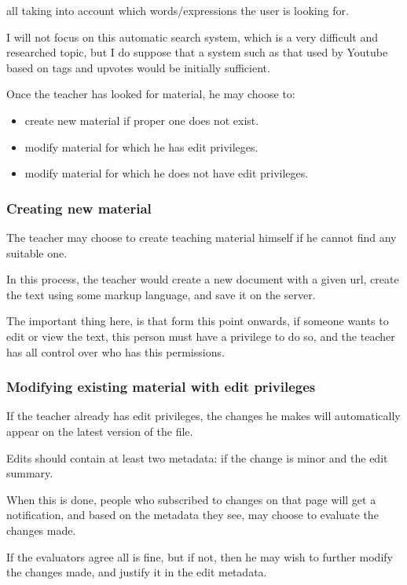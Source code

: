 \documentclass[12pt]{article}
\begin{document}
all taking into account which words/expressions the user is looking for.

I will not focus on this automatic search system, which is a very difficult and researched topic, but I do suppose that a system such as that used by Youtube based on tags and upvotes would be initially sufficient.

Once the teacher has looked for material, he may choose to:

\begin{itemize}
  \item create new material if proper one does not exist.
  \item modify material for which he has edit privileges.
  \item modify material for which he does not have edit privileges.
\end{itemize}

\subsubsection{Creating new material}

The teacher may choose to create teaching material himself if he cannot find any suitable one.

In this process, the teacher would create a new document with a given url, create the text using some markup language, and save it on the server.

The important thing here, is that form this point onwards, if someone wants to edit or view the text, this person must have a privilege to do so, and the teacher has all control over who has this permissions.

\subsubsection{Modifying existing material with edit privileges}

If the teacher already has edit privileges, the changes he makes will automatically appear on the latest version of the file.

Edits should contain at least two metadata: if the change is minor and the edit summary.

When this is done, people who subscribed to changes on that page will get a notification, and based on the metadata they see, may choose to evaluate the changes made.

If the evaluators agree all is fine, but if not, then he may wish to further modify the changes made, and justify it in the edit metadata.
\end{document}
